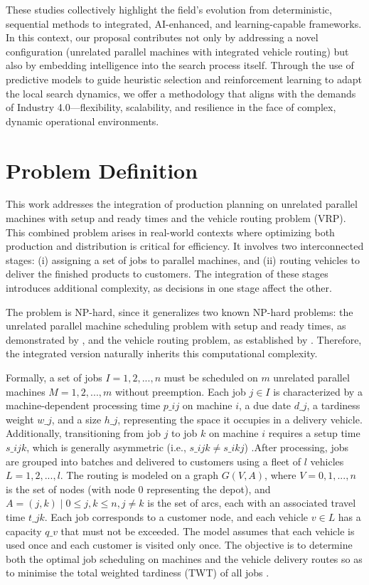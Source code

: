 \documentclass{article}
\begin{document}
These studies collectively highlight the field’s evolution from deterministic, sequential methods to integrated, AI-enhanced, and learning-capable frameworks. In this context, our proposal contributes not only by addressing a novel configuration (unrelated parallel machines with integrated vehicle routing) but also by embedding intelligence into the search process itself. Through the use of predictive models to guide heuristic selection and reinforcement learning to adapt the local search dynamics, we offer a methodology that aligns with the demands of Industry 4.0—flexibility, scalability, and resilience in the face of complex, dynamic operational environments.


\section{Problem Definition}
\label{sec:ProblemDefinition}
This work addresses the integration of production planning on unrelated parallel machines with setup and ready times and the vehicle routing problem (VRP). This combined problem arises in real-world contexts where optimizing both production and distribution is critical for efficiency. It involves two interconnected stages: (i) assigning a set of jobs to parallel machines, and (ii) routing vehicles to deliver the finished products to customers. The integration of these stages introduces additional complexity, as decisions in one stage affect the other.

The problem is NP-hard, since it generalizes two known NP-hard problems: the unrelated parallel machine scheduling problem with setup and ready times, as demonstrated by \citet{lin2014unrelated}, and the vehicle routing problem, as established by \citet{lenstra1981complexity}. Therefore, the integrated version naturally inherits this computational complexity.

Formally, a set of jobs $I = {1, 2, ..., n}$ must be scheduled on $m$ unrelated parallel machines $M = {1, 2, ..., m}$ without preemption. Each job $j \in I$ is characterized by a machine-dependent processing time $p\_{ij}$ on machine $i$, a due date $d\_j$, a tardiness weight $w\_j$, and a size $h\_j$, representing the space it occupies in a delivery vehicle. Additionally, transitioning from job $j$ to job $k$ on machine $i$ requires a setup time $s\_{ijk}$, which is generally asymmetric (i.e., $s\_{ijk} \neq s\_{ikj}$) \citep{de2022heuristics}.After processing, jobs are grouped into batches and delivered to customers using a fleet of $l$ vehicles $L = {1, 2, ..., l}$. The routing is modeled on a graph $G(V, A)$, where $V = {0, 1, ..., n}$ is the set of nodes (with node 0 representing the depot), and $A = {(j,k) \mid 0 \leq j,k \leq n, j \neq k}$ is the set of arcs, each with an associated travel time $t\_{jk}$. Each job corresponds to a customer node, and each vehicle $v \in L$ has a capacity $q\_v$ that must not be exceeded. The model assumes that each vehicle is used once and each customer is visited only once. The objective is to determine both the optimal job scheduling on machines and the vehicle delivery routes so as to minimise the total weighted tardiness (TWT) of all jobs \citep{de2022heuristics}.
\end{document}
